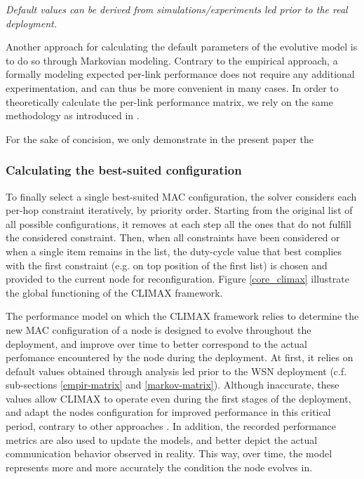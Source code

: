 \documentclass[12pt,journal,compsoc]{IEEEtran}
\begin{document}
\textit{Default values can be derived from simulations/experiments led prior to the real deployment.}

Another approach for calculating the default parameters of the evolutive model is to do so through Markovian modeling. Contrary to the empirical approach, a formally modeling expected per-link performance does not require any additional experimentation, and can thus be more convenient in many cases.
In order to theoretically calculate the per-link performance matrix, we rely on the same methodology as introduced in \cite{yang11}. 

For the sake of concision, we only demonstrate in the present paper the 

\subsubsection{Calculating the best-suited configuration}

To finally select a single best-suited MAC configuration, the solver considers each per-hop constraint iteratively, by priority order. Starting from the original list of all possible configurations, it removes at each step all the ones that do not fulfill the considered constraint. Then, when all constraints have been considered or when a single item remains in the list, the duty-cycle value that best complies with the first constraint (e.g. on top position of the first list) is chosen and provided to the current node for reconfiguration. Figure \ref{core_climax} illustrate the global functioning of the CLIMAX framework.%

The performance model on which the CLIMAX framework relies to determine the new MAC configuration of a node is designed to evolve throughout the deployment, and improve over time to better correspond to the actual perfomance encountered by the node during the deployment. At first, it relies on default values obtained through analysis led prior to the WSN deployment (c.f. sub-sections \ref{empir-matrix} and \ref{markov-matrix}). Although inaccurate, these values allow CLIMAX to operate even during the first stages of the deployment, and adapt the nodes configuration for improved performance in this critical period, contrary to other approaches \cite{zfm12ptunes, ecc12cross, mh10duty}. In addition, the recorded performance metrics are also used to update the models, and better depict the actual communication behavior observed in reality. This way, over time, the model represents more and more accurately the condition the node  evolves in.
\end{document}
